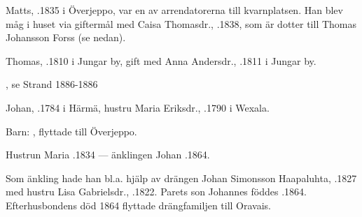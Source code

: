 Matts, .1835 i Överjeppo, var en av arrendatorerna till kvarnplatsen. Han blev måg i huset via giftermål med Caisa Thomasdr., .1838, som är dotter till Thomas Johansson Forss (se nedan).
\begin{jhchildren}
  \item {}
  \item {}
  \item {}
  \item {}
\end{jhchildren}


Thomas, .1810 i Jungar by, gift med Anna Andersdr., .1811 i Jungar by.
\begin{jhchildren}
  \item {}
  \item {}
  \item {}
  \item {}
  \item {}
  \item {}
  \item {}
  \item {}, se Strand 1886-1886
\end{jhchildren}


Johan, .1784 i Härmä, hustru Maria Eriksdr., .1790 i Wexala.

Barn: , flyttade till Överjeppo.

Hustrun Maria .1834 --- änklingen Johan .1864.

Som änkling hade han bl.a. hjälp av drängen Johan Simonsson Haapaluhta, .1827 med hustru Lisa Gabrielsdr., .1822. Parets son Johannes föddes .1864. Efterhusbondens död 1864 flyttade drängfamiljen till Oravais.



